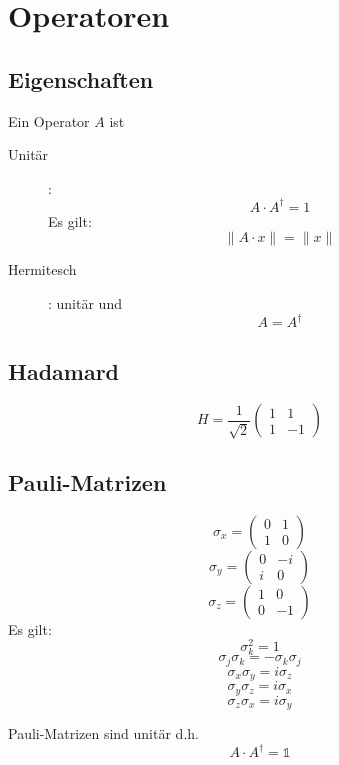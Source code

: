 \documentclass{article}
\begin{document}
\section{Operatoren}
\subsection{Eigenschaften}
Ein Operator $A$ ist
\begin{description}
\item[Unitär]:
  \[ A\cdot A^\dagger = 1 \]
  Es gilt:
  \[ \| A\cdot x \| = \| x \| \]
\item[Hermitesch]: unitär und
  \[ A = A^\dagger \]
\end{description}
\subsection{Hadamard}

\[ H = \frac{1}{\sqrt{2}}\left(\begin{array}{rr}
    1 &  1\\
    1 & -1
  \end{array}\right) \]
\subsection{Pauli-Matrizen}
\[ \sigma_x = \left(\begin{array}{rr}
    0 & 1\\
    1 & 0
  \end{array} \right) \]
\[ \sigma_y = \left(\begin{array}{rr}
    0 & -i\\
    i & 0
  \end{array} \right) \]
\[ \sigma_z = \left(\begin{array}{rr}
    1 & 0\\
    0 & -1
  \end{array}\right) \]
Es gilt:
\[ \sigma_k^2 = 1 \]
\[ \sigma_j\sigma_k = -\sigma_k\sigma_j \]
\[ \sigma_x\sigma_y = i\sigma_z \]
\[ \sigma_y\sigma_z = i\sigma_x \]
\[ \sigma_z\sigma_x = i\sigma_y \]

Pauli-Matrizen sind unitär d.h. 
\[ A \cdot A^{\dagger} = \mathbb{1} \]
  
\end{document}
